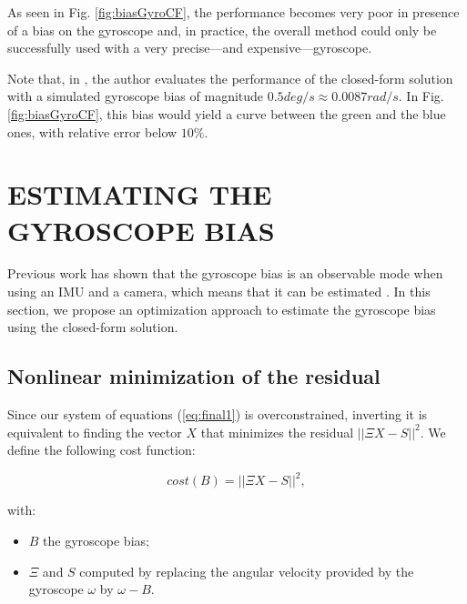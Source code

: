 \documentclass[letterpaper, 10 pt, journal, twoside]{IEEEtran}  %
\begin{document}
As seen in Fig. \ref{fig:biasGyroCF}, the performance becomes very poor in presence of a bias on the gyroscope and, in practice, the overall method could only be successfully used with a very precise---and expensive---gyroscope.

Note that, in \cite{Martinelli2014}, the author evaluates the performance of the closed-form solution with a simulated gyroscope bias of magnitude $0.5deg/s \approx 0.0087 rad/s$.
In Fig. \ref{fig:biasGyroCF}, this bias would yield a curve between the green and the blue ones, with relative error below $10\%$.



\section{ESTIMATING THE GYROSCOPE BIAS}\label{SectionCalibration}

Previous work has shown that the gyroscope bias is an observable mode when using an IMU and a camera, which means that it can be estimated \cite{Martinelli2012}.
In this section, we propose an optimization approach to estimate the gyroscope bias using the closed-form solution.

%


\subsection{Nonlinear minimization of the residual}

Since our system of equations (\ref{eq:final1}) is overconstrained,
inverting it is equivalent to finding the vector $X$ that minimizes the residual $||\Xi X - S||^2$.
We define the following cost function:

\begin{equation}
  \label{eq:cost}
  cost(B) = ||\Xi X - S||^2,
\end{equation}

\noindent with:
\begin{itemize}
\item $B$ the gyroscope bias;
\item $\Xi$ and $S$ computed by replacing the angular velocity provided by the gyroscope $\omega$ by $\omega - B$.
\end{itemize}
\end{document}
